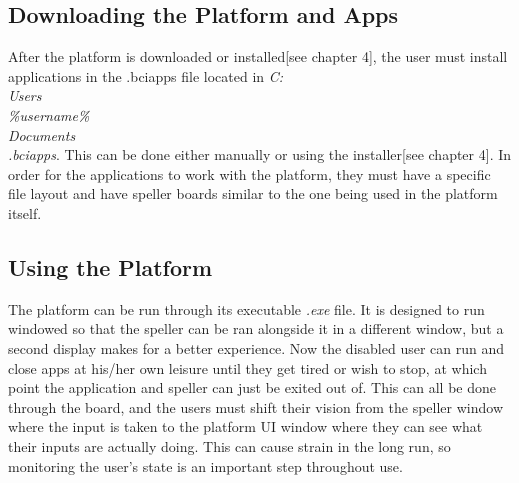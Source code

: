 \subsection{Downloading the Platform and Apps}
After the platform is downloaded or installed[see chapter 4], the user must install applications in the .bciapps file located in \textit{C:\\Users\\\%username\%\\Documents\\.bciapps}. This can be done either manually or using the installer[see chapter 4]. In order for the applications to work with the platform, they must have a specific file layout and have speller boards similar to the one being used in the platform itself.
\subsection{Using the Platform}
The platform can be run through its executable \textit{.exe} file. It is designed to run windowed so that the speller can be ran alongside it in a different window, but a second display makes for a better experience. Now the disabled user can run and close apps at his/her own leisure until they get tired or wish to stop, at which point the application and speller can just be exited out of. This can all be done through the board, and the users must shift their vision from the speller window where the input is taken to the platform UI window where they can see what their inputs are actually doing. This can cause strain in the long run, so monitoring the user's state is an important step throughout use.

